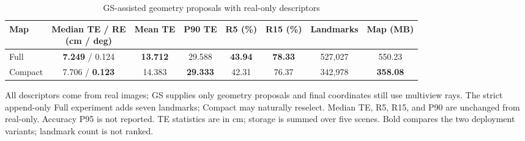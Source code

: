\begin{table}[tp]
\centering
\footnotesize
\setlength{\tabcolsep}{4pt}
\renewcommand{\arraystretch}{1.12}
\caption{GS-assisted geometry proposals with real-only descriptors}
\label{tab:s_gs_assisted}
\begin{tabular}{lccccccc}
\toprule
Map & \shortstack{Median TE / RE\\(cm / deg)} & Mean TE & P90 TE & R5 (\%) & R15 (\%) & Landmarks & Map (MB) \\
\midrule
Full & \textbf{7.249} / 0.124 & \textbf{13.712} & 29.588 & \textbf{43.94} & \textbf{78.33} & 527,027 & 550.23 \\
Compact & 7.706 / \textbf{0.123} & 14.383 & \textbf{29.333} & 42.31 & 76.37 & 342,978 & \textbf{358.08} \\
\bottomrule
\end{tabular}
\par\smallskip\begin{minipage}{0.98\linewidth}\footnotesize All descriptors come from real images; GS supplies only geometry proposals and final coordinates still use multiview rays. The strict append-only Full experiment adds seven landmarks; Compact may naturally reselect. Median TE, R5, R15, and P90 are unchanged from real-only. Accuracy P95 is not reported. TE statistics are in cm; storage is summed over five scenes. Bold compares the two deployment variants; landmark count is not ranked.\end{minipage}
\end{table}
